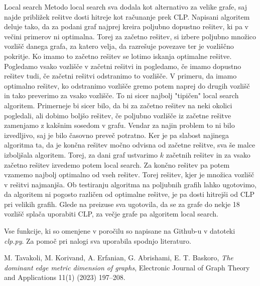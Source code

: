 \documentclass[12pt,a4paper]{amsart}
\makeatletter
\renewcommand\section{\@startsection{section}{1}%
  \z@{.5\linespacing\@plus.7\linespacing}{.5\linespacing}%
  {\normalfont\scshape\large\centering}}
\theoremstyle{plain} %
\makeatother
\begin{document}
\section{Local search}
    Metodo local search sva dodala kot alternativo za velike grafe, saj najde približek rešitve dosti hitreje kot 
    računanje prek CLP. Napisani algoritem deluje tako, da za podani graf najprej kreira poljubno dopustno rešitev, 
    ki pa v večini primerov ni optimalna. Torej za začetno rešitev, si izbere poljubno množico vozlišč danega grafa,
    za katero velja, da razrešuje povezave ter je vozliščno pokritje. Ko imamo to začetno rešitev se lotimo iskanja 
    optimalne rešitve. Pogledamo vsako vozlišče v začetni rešitvi in pogledamo, če imamo dopustno rešitev tudi, če 
    začetni rešitvi odstranimo to vozlišče. V primeru, da imamo optimalno rešitev, ko odstranimo vozlišče gremo potem 
    naprej do drugih vozlišč in tako preverimo za vsako vozlišče. To ni sicer najbolj "tipičen" local search algoritem.
    Primerneje bi sicer bilo, da bi za začetno rešitev na neki okolici pogledali, ali dobimo boljšo rešitev, če poljubno
    vozlišče iz začetne rešitve zamenjamo z kakšnim sosedom v grafu. Vendar za najin problem to ni bilo izvedljivo, saj
    je bilo časovno preveč potratno. Ker je pa slabost najinega algoritma ta, da je končna rešitev močno odvisna od začetne
    rešitve, sva še malce izboljšala algoritem. Torej, za dani graf ustvarimo $k$ začetnih rešitev in za vsako začetno
    rešitev izvedemo potem local search. Za končno rešitev pa potem vzamemo najbolj optimalno od vseh rešitev. Torej
    rešitev, kjer je množica vozlišč v rešitvi najmanjša. Ob testiranju algoritma na poljubnih grafih lahko ugotovimo, 
    da algoritem ni pogosto različen od optimalne rešitve, je pa dosti hitrejši od CLP pri velikih grafih. 
    Glede na preizuse sva ugotovila, da se za grafe do nekje 18 vozlišč splača uporabiti CLP, za večje grafe pa algoritem local search.


\bigskip
Vse funkcije, ki so omenjene v poročilu so napisane na Github-u v datoteki \emph{clp.py}.
Za pomoč pri nalogi sva uporabila spodnjo literaturo.
\begin{thebibliography}{99}
    M. Tavakoli, M. Korivand, A. Erfanian, G. Abrishami, E. T. Baskoro,
    \emph{The dominant edge metric dimension of graphs},
    Electronic Journal of Graph Theory and Applications 11(1) (2023) 197–208.  
\end{thebibliography}
\end{document}
